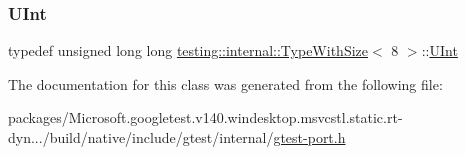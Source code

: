 \subsubsection{\texorpdfstring{UInt}{UInt}}
{\footnotesize\ttfamily typedef unsigned long long \mbox{\hyperlink{classtesting_1_1internal_1_1_type_with_size}{testing\+::internal\+::\+Type\+With\+Size}}$<$ 8 $>$\+::\mbox{\hyperlink{classtesting_1_1internal_1_1_type_with_size_3_018_01_4_a747e21c5aee8faf07ec65cd4c3d1ca62}{U\+Int}}}



The documentation for this class was generated from the following file\+:\begin{DoxyCompactItemize}
\item 
packages/\+Microsoft.\+googletest.\+v140.\+windesktop.\+msvcstl.\+static.\+rt-\/dyn.../build/native/include/gtest/internal/\mbox{\hyperlink{gtest-port_8h}{gtest-\/port.\+h}}\end{DoxyCompactItemize}
